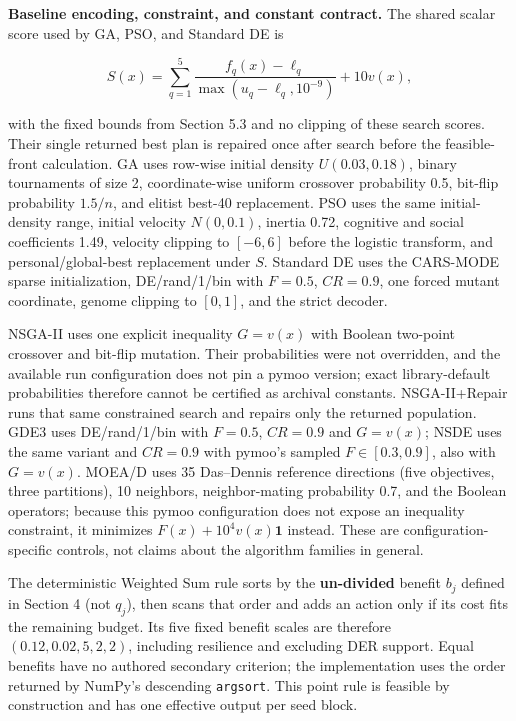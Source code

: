 \documentclass[energies,article,submit,moreauthors]{Definitions/mdpi}
\begin{document}
\textbf{Baseline encoding, constraint, and constant contract.} The shared scalar score used by GA, PSO, and Standard DE is

\[
S(x)=\sum_{q=1}^{5}\frac{f_q(x)-\ell_q}{\max(u_q-\ell_q,10^{-9})}+10v(x),
\]

with the fixed bounds from Section 5.3 and no clipping of these search scores. Their single returned best plan is repaired once after search before the feasible-front calculation. GA uses row-wise initial density \(U(0.03,0.18)\), binary tournaments of size 2, coordinate-wise uniform crossover probability 0.5, bit-flip probability \(1.5/n\), and elitist best-40 replacement. PSO uses the same initial-density range, initial velocity \(N(0,0.1)\), inertia 0.72, cognitive and social coefficients 1.49, velocity clipping to \([-6,6]\) before the logistic transform, and personal/global-best replacement under \(S\). Standard DE uses the CARS-MODE sparse initialization, DE/rand/1/bin with \(F=0.5\), \(CR=0.9\), one forced mutant coordinate, genome clipping to \([0,1]\), and the strict decoder.

NSGA-II uses one explicit inequality \(G=v(x)\) with Boolean two-point crossover and bit-flip mutation. Their probabilities were not overridden, and the available run configuration does not pin a pymoo version; exact library-default probabilities therefore cannot be certified as archival constants. NSGA-II+Repair runs that same constrained search and repairs only the returned population. GDE3 uses DE/rand/1/bin with \(F=0.5\), \(CR=0.9\) and \(G=v(x)\); NSDE uses the same variant and \(CR=0.9\) with pymoo's sampled \(F\in[0.3,0.9]\), also with \(G=v(x)\). MOEA/D uses 35 Das--Dennis reference directions (five objectives, three partitions), 10 neighbors, neighbor-mating probability 0.7, and the Boolean operators; because this pymoo configuration does not expose an inequality constraint, it minimizes \(F(x)+10^4v(x)\mathbf 1\) instead. These are configuration-specific controls, not claims about the algorithm families in general.

The deterministic Weighted Sum rule sorts by the \textbf{un-divided} benefit \(b_j\) defined in Section 4 (not \(q_j\)), then scans that order and adds an action only if its cost fits the remaining budget. Its five fixed benefit scales are therefore \((0.12,0.02,5,2,2)\), including resilience and excluding DER support. Equal benefits have no authored secondary criterion; the implementation uses the order returned by NumPy's descending \texttt{argsort}. This point rule is feasible by construction and has one effective output per seed block.
\end{document}
